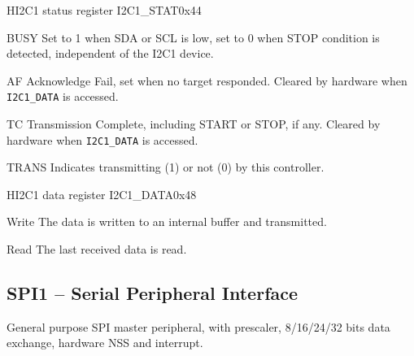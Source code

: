 \documentclass[12pt]{article}
\begin{document}
\begin{register}{H}{I2C1 status register I2C1\_STAT}{0x44}
\label{i2c1stat}
%
%
%
%
%
%
\regnewline%
\end{register}
\begin{regdesc}[0.8\textwidth]\begin{reglist}[0000000]
\item [BUSY] Set to 1 when SDA or SCL is low, set to 0 when STOP condition is detected, independent of the I2C1 device.
\item [AF] Acknowledge Fail, set when no target responded. Cleared by hardware when \lstinline|I2C1_DATA| is accessed.
\item [TC] Transmission Complete, including START or STOP, if any. Cleared by hardware when \lstinline|I2C1_DATA| is accessed.
\item [TRANS] Indicates transmitting (1) or not (0) by this controller.
\end{reglist}\end{regdesc}

\begin{register}{H}{I2C1 data register I2C1\_DATA}{0x48}
\label{i2c11data}
%
%
\regnewline%
\end{register}
\begin{regdesc}[0.8\textwidth]\begin{reglist}[000000000]
\item[Write] The data is written to an internal buffer and transmitted.
\item[Read] The last received data is read.
\end{reglist}\end{regdesc}


\subsection{SPI1 -- Serial Peripheral Interface}
General purpose SPI master peripheral, with prescaler, 8/16/24/32 bits data exchange, hardware NSS and interrupt.
\end{document}
